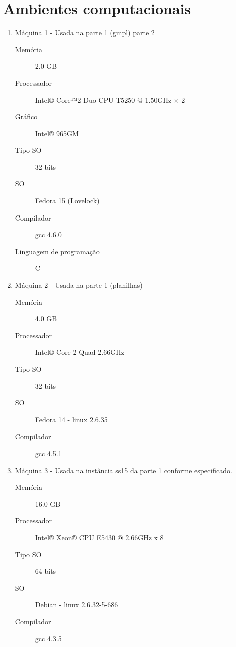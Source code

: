 \documentclass[11pt,letterpaper]{article}
\begin{document}
\section{Ambientes computacionais}
\begin{enumerate}
\item Máquina 1 - Usada na parte 1 (gmpl) parte 2

  \begin{description}
  \item[Memória]2.0 GB
  \item[Processador]  Intel® Core™2 Duo CPU T5250 @ 1.50GHz × 2
  \item[Gráfico] Intel® 965GM   
  \item[Tipo SO] 32 bits   
  \item[SO] Fedora 15 (Lovelock)   
  \item[Compilador] gcc 4.6.0 
  \item[Linguagem de programação] C
  \end{description}

\item Máquina 2 - Usada na parte 1 (planilhas)

  \begin{description}
  \item[Memória]4.0 GB
  \item[Processador]  Intel®  Core 2 Quad 2.66GHz
  \item[Tipo SO] 32 bits   
  \item[SO] Fedora 14 - linux 2.6.35 
  \item[Compilador] gcc 4.5.1 

  \end{description}


\item Máquina 3 - Usada na instância ss15 da parte 1 conforme especificado. 

  \begin{description}
  \item[Memória]16.0 GB
  \item[Processador] Intel® Xeon® CPU E5430  @ 2.66GHz x 8  
  \item[Tipo SO] 64 bits   
  \item[SO] Debian - linux 2.6.32-5-686 
  \item[Compilador] gcc 4.3.5 
  \end{description}

\end{enumerate}

% 
%   
\end{document}
